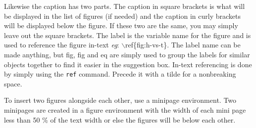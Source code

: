 Likewise the caption has two parts. The caption in square brackets is what will be displayed in the list of figures (if needed) and the caption in curly brackets will be displayed below the figure. If these two are the same, you may simply leave out the square brackets. The label is the variable name for the figure and is used to reference the figure in-text \textit{eg}: $\backslash$ref\{fig:h-vs-t\}. The label name can be made anything, but \textsf{fig}, \textsf{fig} and \textsf{eq} are simply used to group the labels for similar objects together to find it easier in the suggestion box. In-text referencing is done by simply using the \texttt{ref} command. Precede it with a tilde for a nonbreaking space.



To insert two figures alongside each other, use a minipage environment. Two minipages are created in a figure environment with the width of each mini page less than 50 \% of the text width or else the figures will be below each other.

